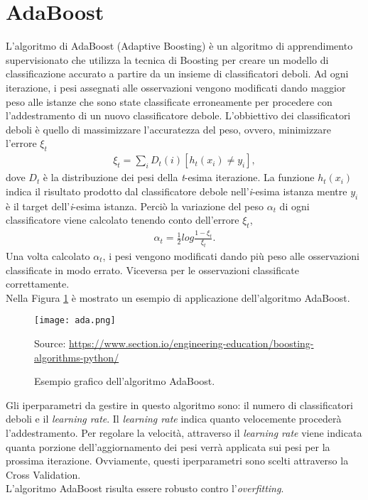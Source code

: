 \section{AdaBoost}
L'algoritmo di AdaBoost (Adaptive Boosting) \autocite{auer1995gambling} è un algoritmo di apprendimento supervisionato che utilizza la tecnica di Boosting per creare un modello di classificazione accurato a partire da un insieme di classificatori deboli. Ad ogni iterazione, i pesi assegnati alle osservazioni vengono modificati dando maggior peso alle istanze che sono state classificate erroneamente per procedere con l'addestramento di un nuovo classificatore debole. L'obbiettivo dei classificatori deboli è quello di massimizzare l'accuratezza del peso, ovvero, minimizzare l'errore $\xi_t$
\begin{align*}
	\xi_t = \sum_{i} D_{t}(i)[h_{t}(x_{i}) \neq y_{i}],
\end{align*} 
dove $D_{t}$ è la distribuzione dei pesi della \emph{t}-esima iterazione. La funzione $h_{t}(x_{i})$ indica il risultato prodotto dal classificatore debole nell'\emph{i}-esima istanza mentre $ y_{i}$ è il target dell'\emph{i}-esima istanza. Perciò la variazione del peso $\alpha_t$ di ogni classificatore viene calcolato tenendo conto dell'errore $\xi_t$,
\begin{align*}
	\alpha_t = \frac{1}{2}log\frac{1-\xi_t}{\xi_t}.
\end{align*} 
Una volta calcolato $\alpha_t$, i pesi vengono modificati dando più peso alle osservazioni classificate in modo errato. Viceversa per le osservazioni classificate correttamente.\\
Nella Figura \ref{fig:ada} è mostrato un esempio di applicazione dell'algoritmo AdaBoost.
\begin{figure}[h]
	\begin{center}
		\texttt{[image: ada.png]}
		\caption{Esempio grafico dell'algoritmo AdaBoost.
		} 
		Source: \url{https://www.section.io/engineering-education/boosting-algorithms-python/}\label{fig:ada}
	\end{center}
\end{figure}
Gli iperparametri da gestire in questo algoritmo sono: il numero di classificatori deboli e il \emph{learning rate}. Il \emph{learning rate} indica quanto velocemente procederà l'addestramento. Per regolare la velocità, attraverso il \emph{learning rate} viene indicata quanta porzione dell'aggiornamento dei pesi verrà applicata sui pesi per la prossima iterazione. Ovviamente, questi iperparametri sono scelti attraverso la Cross Validation.\\
L'algoritmo AdaBoost risulta essere robusto contro l'\emph{overfitting}.
	
